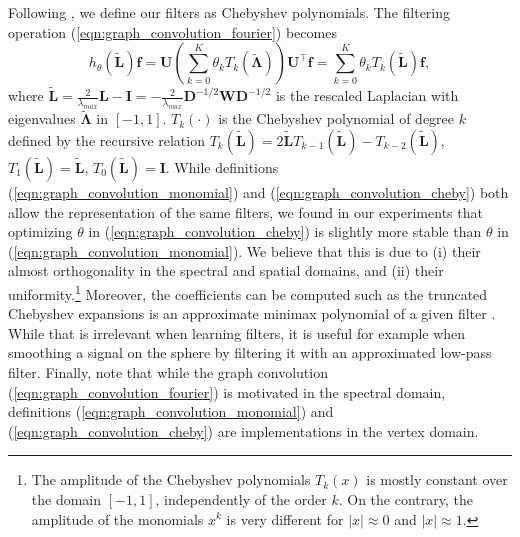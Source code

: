 \documentclass[final,twocolumn,3p,times,sort&compress]{elsarticle}
\newcommand{\todo}[1]{{\color[rgb]{.6,.1,.6}{#1}}}
\newcommand{\eqnref}[1]{(\ref{eqn:#1})}
\renewcommand{\b}[1]{{\bm{#1}}}   %
\newcommand{\1}{\b{1}}              %
\newcommand{\0}{\b{0}}              %
\renewcommand{\L}{\b{L}}
\newcommand{\tL}{\tilde{\L}}
\newcommand{\W}{\b{W}}
\newcommand{\D}{\b{D}}
\newcommand{\U}{\b{U}}
\newcommand{\f}{\b{f}}
\newcommand{\trans}{^\intercal}
\newcommand{\bLambda}{\b{\Lambda}}
\begin{document}
Following \citep{defferrard2016convolutional}, we define our filters as Chebyshev polynomials.
The filtering operation \eqnref{graph_convolution_fourier} becomes
\begin{equation} \label{eqn:graph_convolution_cheby}
	h_\theta\left(\tL\right) \f = \U \left(\sum_{k=0}^K \theta_k T_k\left(\tilde{\bLambda}\right) \right) \U\trans \f = \sum_{k=0}^K \theta_k T_k\left(\tL\right) \f,
\end{equation}
where $\tL = \frac{2}{\lambda_{max}} \L - \b{I} = -\frac{2}{\lambda_{max}} \D^{-1/2} \W \D^{-1/2}$ is the rescaled Laplacian with eigenvalues $\tilde{\b \Lambda}$ in $[-1, 1]$.
$T_k(\cdot)$ is the Chebyshev polynomial of degree $k$ defined by the recursive relation $T_k(\tL) = 2\tL T_{k-1}(\tL) - T_{k-2}(\tL)$, $T_1(\tL) = \tL$, $T_0(\tL) = \b{I}$.
While definitions \eqnref{graph_convolution_monomial} and \eqnref{graph_convolution_cheby} both allow the representation of the same filters, we found in our experiments that optimizing $\theta$ in \eqnref{graph_convolution_cheby} is slightly more stable than $\theta$ in \eqnref{graph_convolution_monomial}.
We believe that this is due to (i) their almost orthogonality in the spectral and spatial domains, and (ii) their uniformity.\footnote{The amplitude of the Chebyshev polynomials $T_k(x)$ is mostly constant over the domain $[-1, 1]$, independently of the order $k$. On the contrary, the amplitude of the monomials $x^k$ is very different for $|x|\approx 0$ and $|x| \approx 1$.}
Moreover, the coefficients can be computed such as the truncated Chebyshev expansions is an approximate minimax polynomial of a given filter \citep{hammond2011wavelets}.
While that is irrelevant when learning filters, it is useful for example when smoothing a signal on the sphere by filtering it with an approximated low-pass filter.
Finally, note that while the graph convolution \eqnref{graph_convolution_fourier} is motivated in the spectral domain, definitions \eqnref{graph_convolution_monomial} and \eqnref{graph_convolution_cheby} are implementations in the vertex domain.
\end{document}
